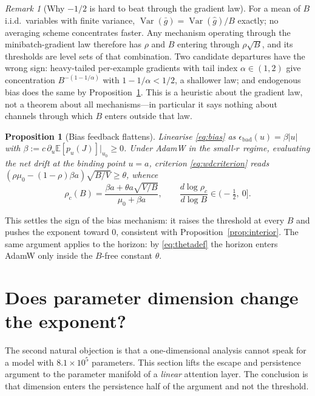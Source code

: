 \documentclass{article}
\theoremstyle{plain}
\newtheorem{proposition}{Proposition}
\theoremstyle{definition}
\theoremstyle{remark}
\newtheorem{remark}{Remark}
\newcommand{\E}{\mathbb{E}}
\newcommand{\Var}{\operatorname{Var}}
\newcommand{\1}{\mathbf{1}}
\newcommand{\bad}{\mathrm{bad}}
\begin{document}
\begin{remark}[Why $-1/2$ is hard to beat through the gradient law]
\label{rem:hardfloor}
For a mean of $B$ i.i.d.\ variables with finite variance,
$\Var(\bar g) = \Var(\hat g)/B$ exactly; no averaging scheme concentrates faster.
Any mechanism operating through the minibatch-gradient law therefore has $\rho$
and $B$ entering through $\rho\sqrt B$, and its thresholds are level sets of that
combination. Two candidate departures have the wrong sign: heavy-tailed
per-example gradients with tail index $\alpha\in(1,2)$ give concentration
$B^{-(1-1/\alpha)}$ with $1-1/\alpha<1/2$, a shallower law; and endogenous bias
does the same by Proposition~\ref{prop:biasflat}. This is a heuristic about the
gradient law, not a theorem about all mechanisms---in particular it says nothing
about channels through which $B$ enters outside that law.
\end{remark}

\begin{proposition}[Bias feedback flattens]
\label{prop:biasflat}
Linearise \eqref{eq:bias} as $\epsilon_\bad(u) = \beta|u|$ with
$\beta := c\,\partial_u\E[p_u(J)]|_{u_0}\ge0$. Under AdamW in the small-$r$
regime, evaluating the net drift at the binding point $u = a$, criterion
\eqref{eq:wdcriterion} reads
$(\rho\mu_0-(1-\rho)\beta a)\sqrt{B/V}\ge\theta$, whence
\begin{equation}
\label{eq:biasflat}
\rho_c(B) = \frac{\beta a + \theta a\sqrt{V/B}}{\mu_0 + \beta a},
\qquad
\frac{d\log\rho_c}{d\log B}\in\Big(-\tfrac12,\ 0\Big].
\end{equation}
\end{proposition}

This settles the sign of the bias mechanism: it raises the threshold at every $B$
and pushes the exponent toward $0$, consistent with
Proposition~\ref{prop:interior}. The same argument applies to the horizon: by
\eqref{eq:thetadef} the horizon enters AdamW only inside the $B$-free constant
$\theta$.

\section{Does parameter dimension change the exponent?}
\label{sec:matrix}

The second natural objection is that a one-dimensional analysis cannot speak for
a model with $8.1\times10^5$ parameters. This section lifts the escape and
persistence argument to the parameter manifold of a \emph{linear} attention
layer. The conclusion is that dimension enters the persistence half of the
argument and not the threshold.
\end{document}
